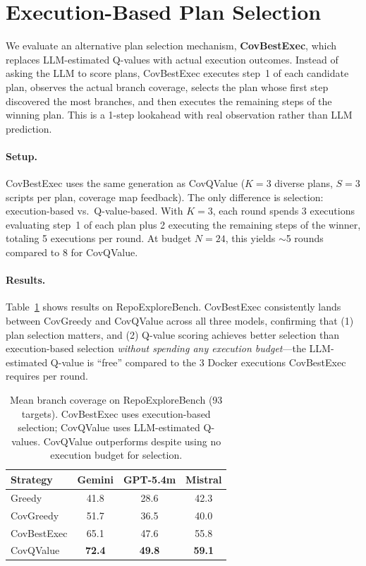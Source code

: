 \section{Execution-Based Plan Selection}
\label{app:bestexec}

We evaluate an alternative plan selection mechanism, \textbf{CovBestExec}, which replaces LLM-estimated Q-values with actual execution outcomes. Instead of asking the LLM to score plans, CovBestExec executes step~1 of each candidate plan, observes the actual branch coverage, selects the plan whose first step discovered the most branches, and then executes the remaining steps of the winning plan. This is a 1-step lookahead with real observation rather than LLM prediction.

\paragraph{Setup.} CovBestExec uses the same generation as CovQValue ($K{=}3$ diverse plans, $S{=}3$ scripts per plan, coverage map feedback). The only difference is selection: execution-based vs.\ Q-value-based. With $K{=}3$, each round spends 3 executions evaluating step~1 of each plan plus 2 executing the remaining steps of the winner, totaling 5 executions per round. At budget $N{=}24$, this yields $\sim$5 rounds compared to 8 for CovQValue.

\paragraph{Results.} Table~\ref{tab:bestexec} shows results on RepoExploreBench. CovBestExec consistently lands between CovGreedy and CovQValue across all three models, confirming that (1) plan selection matters, and (2) Q-value scoring achieves better selection than execution-based selection \textit{without spending any execution budget}---the LLM-estimated Q-value is ``free'' compared to the 3 Docker executions CovBestExec requires per round.

\begin{table}[h]
\centering
\small
\begin{tabular}{lccc}
\toprule
\textbf{Strategy} & \textbf{Gemini} & \textbf{GPT-5.4m} & \textbf{Mistral} \\
\midrule
Greedy & 41.8 & 28.6 & 42.3 \\
CovGreedy & 51.7 & 36.5 & 40.0 \\
CovBestExec & 65.1 & 47.6 & 55.8 \\
CovQValue & \textbf{72.4} & \textbf{49.8} & \textbf{59.1} \\
\bottomrule
\end{tabular}
\caption{Mean branch coverage on RepoExploreBench (93 targets). CovBestExec uses execution-based selection; CovQValue uses LLM-estimated Q-values. CovQValue outperforms despite using no execution budget for selection.}
\label{tab:bestexec}
\end{table}

